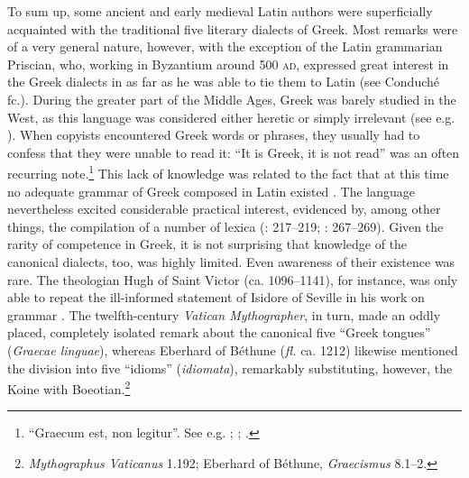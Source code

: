 To sum up, some ancient and early medieval Latin authors were superficially acquainted with the traditional five literary dialects of Greek. Most remarks were of a very general nature, however, with the exception of the Latin grammarian Priscian, who, working in Byzantium around 500 \textsc{ad}, expressed great interest in the Greek dialects in as far as he was able to tie them to Latin (see Conduché fc.). During the greater part of the Middle Ages, Greek was barely studied in the West, as this language was considered either heretic or simply irrelevant (see e.g. \citealt{Boulhol2014}). When copyists encountered Greek words or phrases, they usually had to confess that they were unable to read it: “It is Greek, it is not read” was an often recurring note.\footnote{ “Graecum est, non legitur”. See e.g. \citet[\textsc{i.}246–275]{Bischoff1961, Bischoff1981}; {\citet[esp. 3ff]{Weiss1977}; \citet[36]{Saladin2000}.}} This lack of knowledge was related to the fact that at this time no adequate grammar of Greek composed in Latin existed \citep[215]{Bischoff1961}. The language nevertheless excited considerable practical interest, evidenced by, among other things, the compilation of a number of lexica (\citealt{Bischoff1961}: 217–219; \citealt{Dahan1995}: 267–269). Given the rarity of competence in Greek, it is not surprising that knowledge of the canonical dialects, too, was highly limited. Even awareness of their existence was rare. The theologian Hugh of Saint Victor (ca. 1096–1141), for instance, was only able to repeat the ill-informed statement of Isidore of Seville in his work on grammar \citep[79]{Hugh1966}. The twelfth-century \textit{Vatican Mythographer}, in turn, made an oddly placed, completely isolated remark about the canonical five “Greek tongues” (\textit{Graecae linguae}), whereas Eberhard of Béthune (\textit{fl.} ca. 1212) likewise mentioned the division into five “idioms” (\textit{idiomata}), remarkably substituting, however, the Koine with Boeotian.\footnote{\textit{Mythographus Vaticanus} 1.192; Eberhard of Béthune, \textit{Graecismus} 8.1–2.}

